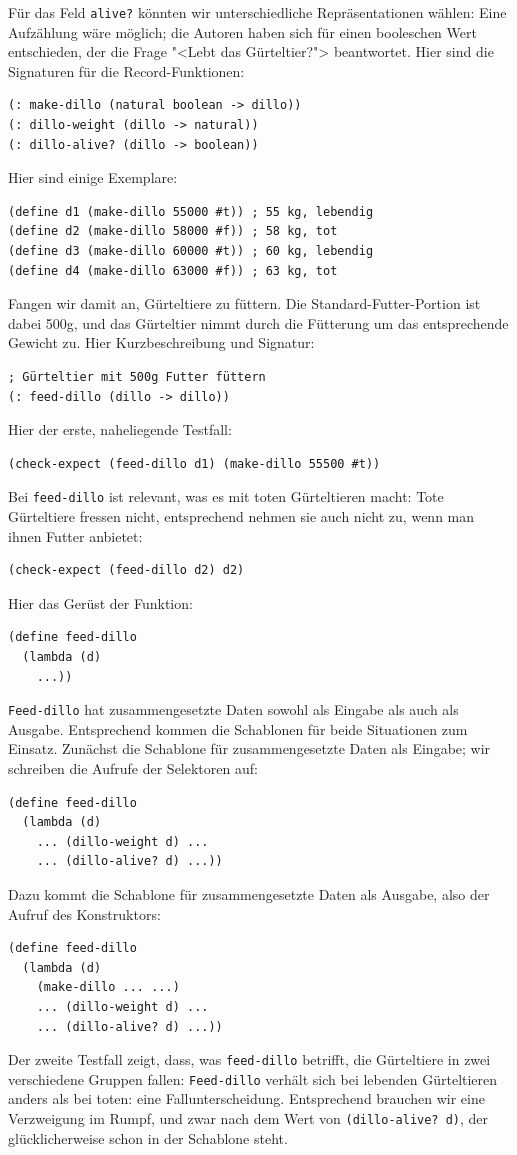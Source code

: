 Für das Feld \texttt{alive?} könnten wir unterschiedliche Repräsentationen
wählen: Eine Aufzählung wäre möglich; die Autoren haben sich für einen
booleschen Wert entschieden, der die Frage "<Lebt das Gürteltier?">
beantwortet.  Hier sind die Signaturen für die Record-Funktionen:
%
\begin{verbatim}
(: make-dillo (natural boolean -> dillo))
(: dillo-weight (dillo -> natural))
(: dillo-alive? (dillo -> boolean))
\end{verbatim}
%
Hier sind einige Exemplare:
%
\begin{verbatim}
(define d1 (make-dillo 55000 #t)) ; 55 kg, lebendig 
(define d2 (make-dillo 58000 #f)) ; 58 kg, tot
(define d3 (make-dillo 60000 #t)) ; 60 kg, lebendig
(define d4 (make-dillo 63000 #f)) ; 63 kg, tot
\end{verbatim}
%
Fangen wir damit an, Gürteltiere zu füttern.  Die
Standard-Futter-Portion ist dabei 500g, und das Gürteltier nimmt durch
die Fütterung um das entsprechende Gewicht zu.  Hier Kurzbeschreibung
und Signatur:
%
\begin{verbatim}
; Gürteltier mit 500g Futter füttern
(: feed-dillo (dillo -> dillo))
\end{verbatim}
%
Hier der erste, naheliegende Testfall:
%
\begin{verbatim}
(check-expect (feed-dillo d1) (make-dillo 55500 #t))
\end{verbatim}
%
Bei \texttt{feed-dillo} ist relevant, was es mit toten
Gürteltieren macht: Tote Gürteltiere fressen nicht, entsprechend
nehmen sie auch nicht zu, wenn man ihnen Futter anbietet:
%
\begin{verbatim}
(check-expect (feed-dillo d2) d2)
\end{verbatim}
%
Hier das Gerüst der Funktion:
\begin{verbatim}
(define feed-dillo
  (lambda (d)
    ...))
\end{verbatim}
%
\texttt{Feed-dillo} hat zusammengesetzte Daten sowohl als Eingabe
als auch als Ausgabe.  Entsprechend kommen die Schablonen für beide
Situationen zum Einsatz.  Zunächst die Schablone für zusammengesetzte
Daten als Eingabe; wir schreiben die Aufrufe der Selektoren auf:
%
\begin{verbatim}
(define feed-dillo
  (lambda (d)
    ... (dillo-weight d) ...
    ... (dillo-alive? d) ...))
\end{verbatim}
%
Dazu kommt die Schablone für zusammengesetzte Daten als Ausgabe, also
der Aufruf des Konstruktors:
%
\begin{verbatim}
(define feed-dillo
  (lambda (d)
    (make-dillo ... ...)
    ... (dillo-weight d) ...
    ... (dillo-alive? d) ...))
\end{verbatim}
%
Der zweite Testfall zeigt, dass, was \texttt{feed-dillo}
betrifft, die Gürteltiere in zwei verschiedene Gruppen fallen:
\texttt{Feed-dillo} verhält sich bei lebenden Gürteltieren anders als
bei toten: eine Fallunterscheidung.  Entsprechend brauchen wir eine
Verzweigung im Rumpf, und zwar nach dem Wert von \texttt{(dillo-alive?
  d)}, der glücklicherweise schon in der Schablone steht.

